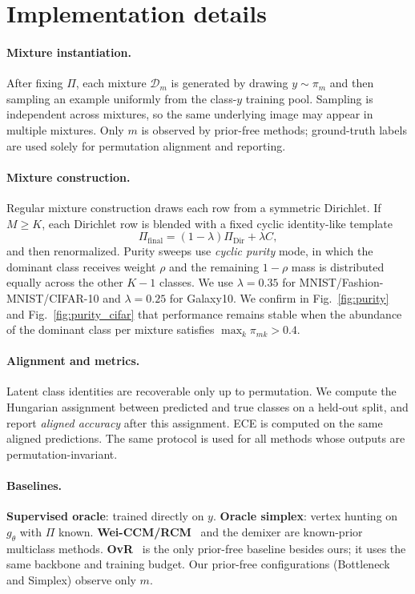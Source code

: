 \documentclass{article}
\theoremstyle{plain}
\theoremstyle{definition}
\theoremstyle{remark}
\newcommand{\D}{\mathcal{D}}
\begin{document}
\section{Implementation details}
\label{app:experimental-details}
 
\paragraph{Mixture instantiation.}
After fixing $\Pi$, each mixture $\D_m$ is generated by drawing
$y\sim\pi_m$ and then sampling an example uniformly from the class-$y$
training pool. Sampling is independent across mixtures, so the same
underlying image may appear in multiple mixtures. Only $m$ is observed by
prior-free methods; ground-truth labels are used solely for permutation
alignment and reporting.
 
\paragraph{Mixture construction.}
Regular mixture construction draws each row from a symmetric Dirichlet. If $M \ge K$, each Dirichlet row is blended with a fixed cyclic identity-like template 
\begin{equation}
    \Pi_{\mathrm{final}} = (1-\lambda)\Pi_{\mathrm{Dir}} + \lambda C,
\end{equation}
and then renormalized. Purity sweeps use \textit{cyclic purity} mode, in which the dominant class receives weight $\rho$ and the remaining $1-\rho$ mass is distributed equally across the other $K-1$ classes. We use $\lambda=0.35$ for MNIST/Fashion-MNIST/CIFAR-10 and $\lambda=0.25$ for Galaxy10. We confirm in Fig.~\ref{fig:purity} and Fig.~\ref{fig:purity_cifar} that performance remains stable when the abundance of the dominant class per mixture satisfies $\max_k \pi_{mk}>0.4$.
 
\paragraph{Alignment and metrics.}
Latent class identities are recoverable only up to permutation. We compute
the Hungarian assignment between predicted and true classes on a held-out
split, and report \emph{aligned accuracy} after this assignment. ECE is
computed on the same aligned predictions. The same protocol is used for
all methods whose outputs are permutation-invariant.
 
\paragraph{Baselines.}
\textbf{Supervised oracle}: trained directly on $y$.
\textbf{Oracle simplex}: vertex hunting on $g_\theta$ with $\Pi$
known. \textbf{Wei-CCM/RCM}~\citep{wei2024consistent} and the
\citep{Tang2022MulticlassCF} demixer are known-prior multiclass methods.
\textbf{OvR}~\citep{Rifkin2004InDO} is the only prior-free baseline besides
ours; it uses the same backbone and training budget. Our prior-free
configurations (Bottleneck and Simplex) observe only $m$.
 
\end{document}
